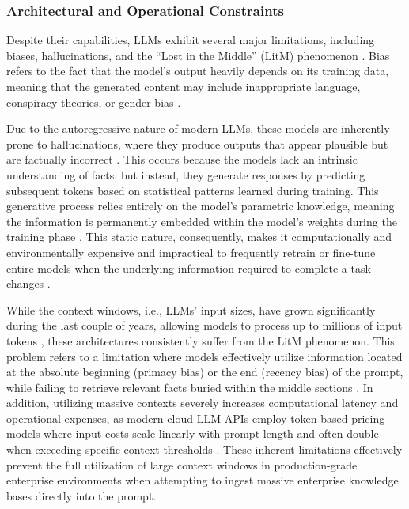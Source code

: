 \subsubsection{Architectural and Operational Constraints}

Despite their capabilities, LLMs exhibit several major limitations, including biases, hallucinations, and the ``Lost in the Middle'' (LitM) phenomenon \citep{introgenai, liu2024lost}. Bias refers to the fact that the model’s output heavily depends on its training data, meaning that the generated content may include inappropriate language, conspiracy theories, or gender bias \citep{introgenai}. 

Due to the autoregressive nature of modern LLMs, these models are inherently prone to hallucinations, where they produce outputs that appear plausible but are factually incorrect \citep{ji2023survey}. This occurs because the models lack an intrinsic understanding of facts, but instead, they generate responses by predicting subsequent tokens based on statistical patterns learned during training. This generative process relies entirely on the model's parametric knowledge, meaning the information is permanently embedded within the model's weights during the training phase \citep{bommasani2021opportunities}. This static nature, consequently, makes it computationally and environmentally expensive and impractical to frequently retrain or fine-tune entire models when the underlying information required to complete a task changes \cite{StanfordAIIndex2026}.

While the context windows, i.e., LLMs' input sizes, have grown significantly during the last couple of years, allowing models to process up to millions of input tokens \citep{geminiteam2024gemini, GoogleDeepMind2025Gemini3Flash}, these architectures consistently suffer from the LitM phenomenon. This problem refers to a limitation where models effectively utilize information located at the absolute beginning (primacy bias) or the end (recency bias) of the prompt, while failing to retrieve relevant facts buried within the middle sections \citep{liu2024lost}. In addition, utilizing massive contexts severely increases computational latency and operational expenses, as modern cloud LLM APIs employ token-based pricing models where input costs scale linearly with prompt length and often double when exceeding specific context thresholds \citep{GoogleVertexAIPricing}. These inherent limitations effectively prevent the full utilization of large context windows in production-grade enterprise environments when attempting to ingest massive enterprise knowledge bases directly into the prompt.

